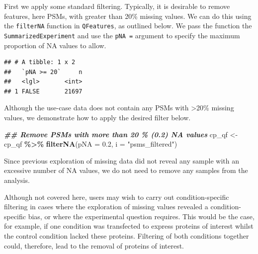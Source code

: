 \documentclass[9pt,a4paper,]{extarticle}
\newenvironment{Shaded}{\begin{snugshade}}{\end{snugshade}}
\newcommand{\AttributeTok}[1]{\textcolor[rgb]{0.13,0.29,0.53}{#1}}
\newcommand{\DecValTok}[1]{\textcolor[rgb]{0.00,0.00,0.81}{#1}}
\newcommand{\DocumentationTok}[1]{\textcolor[rgb]{0.56,0.35,0.01}{\textbf{\textit{#1}}}}
\newcommand{\FloatTok}[1]{\textcolor[rgb]{0.00,0.00,0.81}{#1}}
\newcommand{\FunctionTok}[1]{\textcolor[rgb]{0.13,0.29,0.53}{\textbf{#1}}}
\newcommand{\NormalTok}[1]{#1}
\newcommand{\OtherTok}[1]{\textcolor[rgb]{0.56,0.35,0.01}{#1}}
\newcommand{\SpecialCharTok}[1]{\textcolor[rgb]{0.81,0.36,0.00}{\textbf{#1}}}
\newcommand{\StringTok}[1]{\textcolor[rgb]{0.31,0.60,0.02}{#1}}
\begin{document}
First we apply some standard filtering. Typically, it is desirable to remove
features, here PSMs, with greater than 20\% missing values. We can do this using
the \texttt{filterNA} function in \texttt{QFeatures}, as outlined below. We pass the function
the \texttt{SummarizedExperiment} and use the \texttt{pNA\ =} argument to specify the maximum
proportion of NA values to allow.

\begin{Shaded}
\end{Shaded}

\begin{verbatim}
## # A tibble: 1 x 2
##   `pNA >= 20`     n
##   <lgl>       <int>
## 1 FALSE       21697
\end{verbatim}

Although the use-case data does not contain any PSMs with \textgreater20\% missing values,
we demonstrate how to apply the desired filter below.

\begin{Shaded}
\begin{Highlighting}[]
\DocumentationTok{\#\# Remove PSMs with more than 20 \% (0.2) NA values}
\NormalTok{cp\_qf }\OtherTok{\textless{}{-}}\NormalTok{ cp\_qf }\SpecialCharTok{\%\textgreater{}\%} 
  \FunctionTok{filterNA}\NormalTok{(}\AttributeTok{pNA =} \FloatTok{0.2}\NormalTok{, }
           \AttributeTok{i =} \StringTok{"psms\_filtered"}\NormalTok{)}
\end{Highlighting}
\end{Shaded}

Since previous exploration of missing data did not reveal any sample with an
excessive number of NA values, we do not need to remove any samples from the
analysis.

Although not covered here, users may wish to carry out condition-specific
filtering in cases where the exploration of missing values revealed a condition-
specific bias, or where the experimental question requires. This would be the
case, for example, if one condition was transfected to express proteins of
interest whilst the control condition lacked these proteins. Filtering of both
conditions together could, therefore, lead to the removal of proteins of interest.
\end{document}
